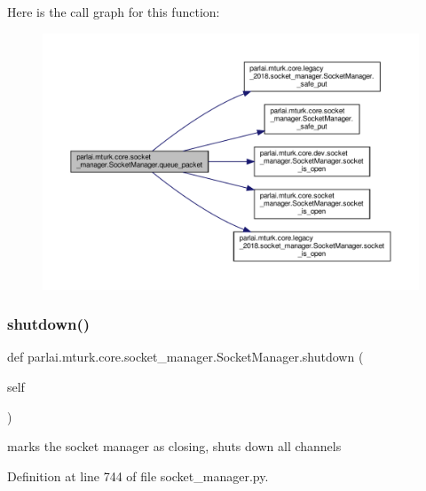 Here is the call graph for this function\+:
\nopagebreak
\begin{figure}[H]
\begin{center}
\leavevmode
\includegraphics[width=350pt]{classparlai_1_1mturk_1_1core_1_1socket__manager_1_1SocketManager_a91c7216d011823f1c6c4963d863638c8_cgraph}
\end{center}
\end{figure}
\mbox{\label{classparlai_1_1mturk_1_1core_1_1socket__manager_1_1SocketManager_ac98d9330dbc0bcfad53a7a66c09fb56a}} 
\subsubsection{\texorpdfstring{shutdown()}{shutdown()}}
{\footnotesize\ttfamily def parlai.\+mturk.\+core.\+socket\+\_\+manager.\+Socket\+Manager.\+shutdown (\begin{DoxyParamCaption}\item[{}]{self }\end{DoxyParamCaption})}

\begin{DoxyVerb}marks the socket manager as closing, shuts down all channels\end{DoxyVerb}
 

Definition at line 744 of file socket\+\_\+manager.\+py.



